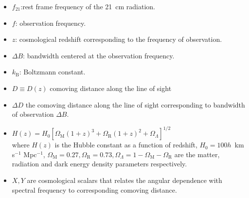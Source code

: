\documentclass[twocolumn]{emulateapj}
\newcommand{\thhat}{{\hat\theta}}
\begin{document}
    \begin{itemize}
    \item
     $f_{21}$:rest frame frequency of the 21~cm radiation.
     \item
    $f$: observation frequency.
    \item
    $z$: cosmological redshift corresponding to the frequency of observation.
    \item
     $\Delta B$: bandwidth centered at the observation frequency.
     \item
     $k_\textrm{B}$: Boltzmann constant.
     \item
     $D\equiv D(z)$ comoving distance along the line of sight
     \item
     $\Delta D$ the comoving distance along the line of sight corresponding to bandwidth of observation $\Delta B$.
     \item
    $H(z)= H_{0} [\Omega_\textrm{M}(1+z)^3+\Omega_\textrm{R}(1+z)^2+\Omega_\Lambda]^{1/2}$\\
     where $H(z)$ is the Hubble constant as a function of redshift, $H_{0}= 100 h$~km s$^{-1}$ Mpc$^{-1}$, $\Omega_\textrm{M}=0.27, \Omega_\textrm{R}= 0.73, \Omega_\Lambda=1-\Omega_\textrm{M}-\Omega_\textrm{R}$ are the matter, radiation and dark energy density parameters respectively.
    \item
    $X, Y$ are cosmological scalars that relates the angular dependence with spectral frequency to corresponding comoving distance.
    \end{itemize}
\end{document}
